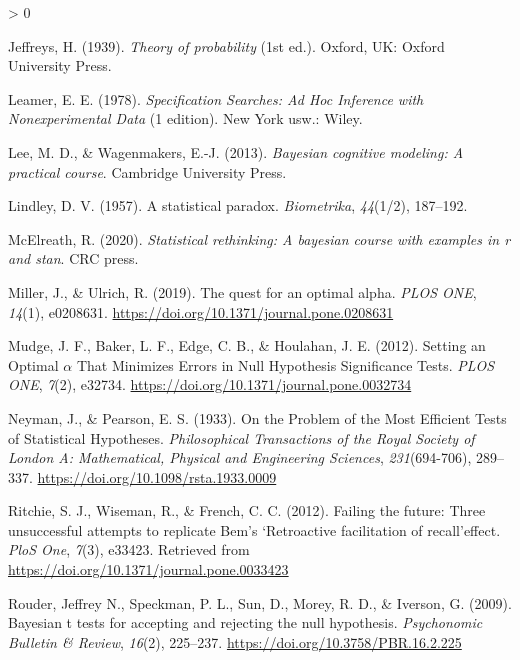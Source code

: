 \documentclass[
  english,
  ,man,floatsintext]{apa6}
\newlength{\cslhangindent}
\newenvironment{CSLReferences}[2] %
 {%
  \setlength{\parindent}{0pt}
  \ifodd #1 \everypar{\setlength{\hangindent}{\cslhangindent}}\ignorespaces\fi
  \ifnum #2 > 0
  \setlength{\parskip}{#2\baselineskip}
  \fi
 }%
 {}
\begin{document}
\begin{CSLReferences}{1}{0}
\leavevmode\hypertarget{ref-Jeffreys1939}{}%
Jeffreys, H. (1939). \emph{Theory of probability} (1st ed.). Oxford, UK: Oxford University Press.

\leavevmode\hypertarget{ref-leamer_specification_1978}{}%
Leamer, E. E. (1978). \emph{Specification {Searches}: {Ad Hoc Inference} with {Nonexperimental Data}} (1 edition). {New York usw.}: {Wiley}.

\leavevmode\hypertarget{ref-LeeWagenmakersBayesBook}{}%
Lee, M. D., \& Wagenmakers, E.-J. (2013). \emph{Bayesian cognitive modeling: {A} practical course}. Cambridge University Press.

\leavevmode\hypertarget{ref-lindley_statistical_1957}{}%
Lindley, D. V. (1957). A statistical paradox. \emph{Biometrika}, \emph{44}(1/2), 187--192.

\leavevmode\hypertarget{ref-mcelreath2020statistical}{}%
McElreath, R. (2020). \emph{Statistical rethinking: A bayesian course with examples in r and stan}. CRC press.

\leavevmode\hypertarget{ref-miller_quest_2019}{}%
Miller, J., \& Ulrich, R. (2019). The quest for an optimal alpha. \emph{PLOS ONE}, \emph{14}(1), e0208631. \url{https://doi.org/10.1371/journal.pone.0208631}

\leavevmode\hypertarget{ref-mudge_setting_2012}{}%
Mudge, J. F., Baker, L. F., Edge, C. B., \& Houlahan, J. E. (2012). Setting an {Optimal} {\(\alpha\)} {That Minimizes Errors} in {Null Hypothesis Significance Tests}. \emph{PLOS ONE}, \emph{7}(2), e32734. \url{https://doi.org/10.1371/journal.pone.0032734}

\leavevmode\hypertarget{ref-neyman_problem_1933}{}%
Neyman, J., \& Pearson, E. S. (1933). On the {Problem} of the {Most Efficient Tests} of {Statistical Hypotheses}. \emph{Philosophical Transactions of the Royal Society of London A: Mathematical, Physical and Engineering Sciences}, \emph{231}(694-706), 289--337. \url{https://doi.org/10.1098/rsta.1933.0009}

\leavevmode\hypertarget{ref-ritchie2012failing}{}%
Ritchie, S. J., Wiseman, R., \& French, C. C. (2012). Failing the future: {T}hree unsuccessful attempts to replicate {B}em's `{R}etroactive facilitation of recall'effect. \emph{PloS One}, \emph{7}(3), e33423. Retrieved from \url{https://doi.org/10.1371/journal.pone.0033423}

\leavevmode\hypertarget{ref-rouder_bayesian_2009}{}%
Rouder, Jeffrey N., Speckman, P. L., Sun, D., Morey, R. D., \& Iverson, G. (2009). Bayesian t tests for accepting and rejecting the null hypothesis. \emph{Psychonomic Bulletin \& Review}, \emph{16}(2), 225--237. \url{https://doi.org/10.3758/PBR.16.2.225}


\end{CSLReferences}
\end{document}
